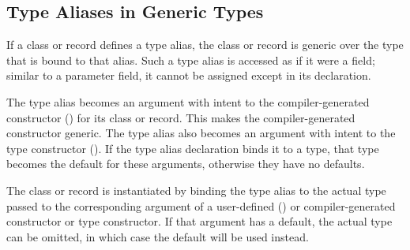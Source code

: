 % 
% 

\subsection{Type Aliases in Generic Types}
\label{Type_Aliases_in_Generic_Types}

If a class or record defines a type alias, the class or record
is generic over the type that is bound to that alias.
Such a type alias is accessed as if it were a field;
similar to a parameter field, it cannot be assigned
except in its declaration.

The type alias becomes an argument with intent  to
the compiler-generated constructor ()
for its class or record. This makes the compiler-generated constructor generic.
The type alias also becomes an argument with intent  to
the type constructor ().
If the type alias declaration binds it to a type, that type
becomes the default for these arguments, otherwise they have no defaults.

The class or record is instantiated by binding the type alias
to the actual type passed to the corresponding argument of
a user-defined ()
or compiler-generated constructor or type constructor.
If that argument has a default, the actual type can be omitted, in
which case the default will be used instead.

